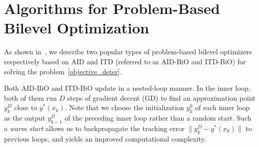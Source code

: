 \documentclass{osudissert96}
\begin{document}
\section{Algorithms for Problem-Based Bilevel Optimization}\label{sec:alg}

As shown in~, we describe two popular types of problem-based bilevel optimizers respectively based on AID and ITD (referred to as AID-BiO and ITD-BiO) for solving the problem~\cref{objective_deter}.  

Both AID-BiO and ITD-BiO update in a nested-loop manner. In the inner loop, both of them run $D$ steps of gradient decent (GD) to find an approximation point $y_k^D$ close to $y^*(x_k)$. 
Note that we choose the initialization $y_{k}^0$ of each inner loop as the output $y_{k-1}^D$ of the preceding inner loop rather than a random start.  Such a {\em warm start} allows us to backpropagate the tracking error $\|y_k^D-y^*(x_k)\|$ to previous loops, and yields an improved computational complexity.
\end{document}
